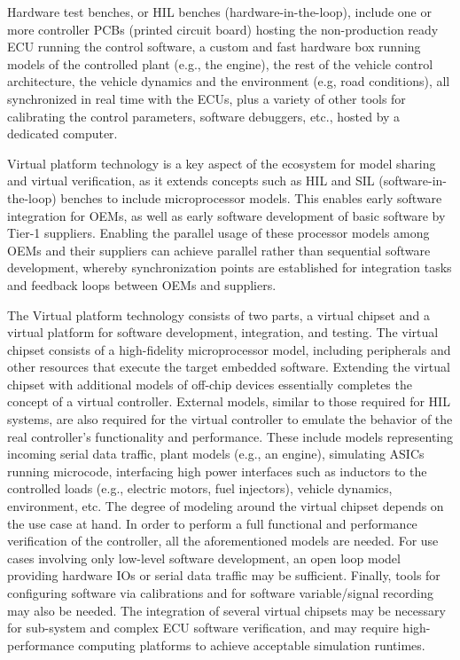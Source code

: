 Hardware test benches, or HIL benches (hardware-in-the-loop), include one or more controller PCBs (printed circuit board) hosting the non-production ready ECU running the control software, a custom and fast hardware box running models of the controlled plant (e.g., the engine), the rest of the vehicle control architecture, the vehicle dynamics and the environment (e.g, road conditions), all synchronized in real time with the ECUs, plus a variety of other tools for calibrating the control parameters, software debuggers, etc., hosted by a dedicated computer.

Virtual platform technology is a key aspect of the ecosystem for model sharing and virtual verification,
as it extends concepts such as HIL and SIL (software-in-the-loop) benches to include microprocessor models.
This enables early software integration for OEMs,
as well as early software development of basic software by Tier-1 suppliers.
Enabling the parallel usage of these processor models among OEMs and their suppliers can achieve parallel rather than sequential software development,
whereby synchronization points are established for integration tasks and feedback loops between OEMs and suppliers.

The Virtual platform technology consists of two parts, a virtual chipset and a virtual platform for software development, integration, and testing.
The virtual chipset consists of a high-fidelity microprocessor model,
including peripherals and other resources that execute the target embedded software.
Extending the virtual chipset with additional models of off-chip devices essentially
completes the concept of a virtual controller.
External models, similar to those required for HIL systems, are also required for the virtual controller to emulate the behavior of the real controller's functionality and performance.
These include models representing incoming serial data traffic,
plant models (e.g., an engine), simulating ASICs running microcode, interfacing high power interfaces such as inductors to the controlled loads (e.g., electric motors, fuel injectors),
vehicle dynamics, environment, etc.
The degree of modeling around the virtual chipset depends on the use case at hand.
In order to perform a full functional and performance verification of the controller, all the aforementioned models are needed.
For use cases involving only low-level software development, an open loop model providing hardware IOs or serial data traffic may be sufficient.
Finally, tools for configuring software via calibrations and for software variable/signal recording may also be needed.
The integration of several virtual chipsets may be necessary for sub-system and complex ECU software verification, and may require high-performance computing platforms to achieve acceptable simulation runtimes.
